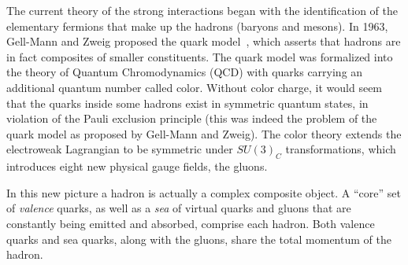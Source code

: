 The current theory of the strong interactions began with the identification of the elementary fermions that make up the hadrons (baryons and mesons). In 1963, Gell-Mann and Zweig proposed the quark model~\cite{GellMann1964214,Zweig2}, which asserts that hadrons are in fact composites of smaller constituents.  
The quark model was formalized into the theory of Quantum Chromodynamics (QCD)  %
with quarks carrying an additional quantum number called color.  Without color charge, it would seem that the quarks inside some hadrons exist in symmetric quantum states, in violation of the Pauli exclusion principle (this was indeed the problem of the quark model as proposed by Gell-Mann and Zweig). The color theory extends the electroweak Lagrangian to be symmetric under $SU(3)_C$ transformations, which introduces eight new physical gauge fields, the gluons. 

In this new picture a hadron is actually a complex composite object. A ``core'' set of \emph{valence} quarks, as well as a \emph{sea} of virtual quarks and gluons that are constantly being emitted and absorbed, comprise each hadron.  %
Both valence quarks and sea quarks, along with the gluons, share the total momentum of the hadron.


